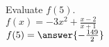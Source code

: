\documentclass{ximera}
\author{David Kish}
\begin{document}
\begin{exercise}
Evaluate $f(5)$.\\
$f(x)= -3x^2+ \frac{x-2}{x+1}$\\
$f(5)=\answer{-\frac{149}{2}}$
\end{exercise}
\end{document}
